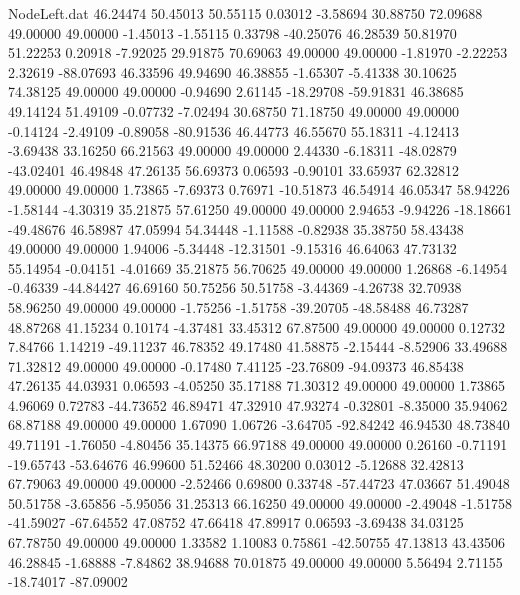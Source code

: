 \begin{filecontents}{NodeLeft.dat}
  46.24474   50.45013   50.55115     0.03012   -3.58694   30.88750   72.09688   49.00000   49.00000   -1.45013   -1.55115    0.33798  -40.25076
  46.28539   50.81970   51.22253     0.20918   -7.92025   29.91875   70.69063   49.00000   49.00000   -1.81970   -2.22253    2.32619  -88.07693
  46.33596   49.94690   46.38855    -1.65307   -5.41338   30.10625   74.38125   49.00000   49.00000   -0.94690    2.61145  -18.29708  -59.91831
  46.38685   49.14124   51.49109    -0.07732   -7.02494   30.68750   71.18750   49.00000   49.00000   -0.14124   -2.49109   -0.89058  -80.91536
  46.44773   46.55670   55.18311    -4.12413   -3.69438   33.16250   66.21563   49.00000   49.00000    2.44330   -6.18311  -48.02879  -43.02401
  46.49848   47.26135   56.69373     0.06593   -0.90101   33.65937   62.32812   49.00000   49.00000    1.73865   -7.69373    0.76971  -10.51873
  46.54914   46.05347   58.94226    -1.58144   -4.30319   35.21875   57.61250   49.00000   49.00000    2.94653   -9.94226  -18.18661  -49.48676
  46.58987   47.05994   54.34448    -1.11588   -0.82938   35.38750   58.43438   49.00000   49.00000    1.94006   -5.34448  -12.31501   -9.15316
  46.64063   47.73132   55.14954    -0.04151   -4.01669   35.21875   56.70625   49.00000   49.00000    1.26868   -6.14954   -0.46339  -44.84427
  46.69160   50.75256   50.51758    -3.44369   -4.26738   32.70938   58.96250   49.00000   49.00000   -1.75256   -1.51758  -39.20705  -48.58488
  46.73287   48.87268   41.15234     0.10174   -4.37481   33.45312   67.87500   49.00000   49.00000    0.12732    7.84766    1.14219  -49.11237
  46.78352   49.17480   41.58875    -2.15444   -8.52906   33.49688   71.32812   49.00000   49.00000   -0.17480    7.41125  -23.76809  -94.09373
  46.85438   47.26135   44.03931     0.06593   -4.05250   35.17188   71.30312   49.00000   49.00000    1.73865    4.96069    0.72783  -44.73652
  46.89471   47.32910   47.93274    -0.32801   -8.35000   35.94062   68.87188   49.00000   49.00000    1.67090    1.06726   -3.64705  -92.84242
  46.94530   48.73840   49.71191    -1.76050   -4.80456   35.14375   66.97188   49.00000   49.00000    0.26160   -0.71191  -19.65743  -53.64676
  46.99600   51.52466   48.30200     0.03012   -5.12688   32.42813   67.79063   49.00000   49.00000   -2.52466    0.69800    0.33748  -57.44723
  47.03667   51.49048   50.51758    -3.65856   -5.95056   31.25313   66.16250   49.00000   49.00000   -2.49048   -1.51758  -41.59027  -67.64552
  47.08752   47.66418   47.89917     0.06593   -3.69438   34.03125   67.78750   49.00000   49.00000    1.33582    1.10083    0.75861  -42.50755
  47.13813   43.43506   46.28845    -1.68888   -7.84862   38.94688   70.01875   49.00000   49.00000    5.56494    2.71155  -18.74017  -87.09002

\end{filecontents}

